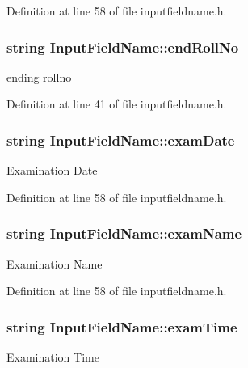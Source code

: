 Definition at line 58 of file inputfieldname.\-h.

\hypertarget{classInputFieldName_a06435f9ba5a529cbba4ee1ce9b02e5cc}{
\subsubsection[{end\-Roll\-No}]{\setlength{\rightskip}{0pt plus 5cm}string Input\-Field\-Name\-::end\-Roll\-No}}\label{classInputFieldName_a06435f9ba5a529cbba4ee1ce9b02e5cc}
ending rollno 

Definition at line 41 of file inputfieldname.\-h.

\hypertarget{classInputFieldName_a4e60d793497c36b2d80e2411cbb915d8}{
\subsubsection[{exam\-Date}]{\setlength{\rightskip}{0pt plus 5cm}string Input\-Field\-Name\-::exam\-Date}}\label{classInputFieldName_a4e60d793497c36b2d80e2411cbb915d8}
Examination Date 

Definition at line 58 of file inputfieldname.\-h.

\hypertarget{classInputFieldName_a4cee41667cdc0e38f8f76af94ef39c36}{
\subsubsection[{exam\-Name}]{\setlength{\rightskip}{0pt plus 5cm}string Input\-Field\-Name\-::exam\-Name}}\label{classInputFieldName_a4cee41667cdc0e38f8f76af94ef39c36}
Examination Name 

Definition at line 58 of file inputfieldname.\-h.

\hypertarget{classInputFieldName_ab667062be019e5912683d33c45885bd3}{
\subsubsection[{exam\-Time}]{\setlength{\rightskip}{0pt plus 5cm}string Input\-Field\-Name\-::exam\-Time}}\label{classInputFieldName_ab667062be019e5912683d33c45885bd3}
Examination Time 

